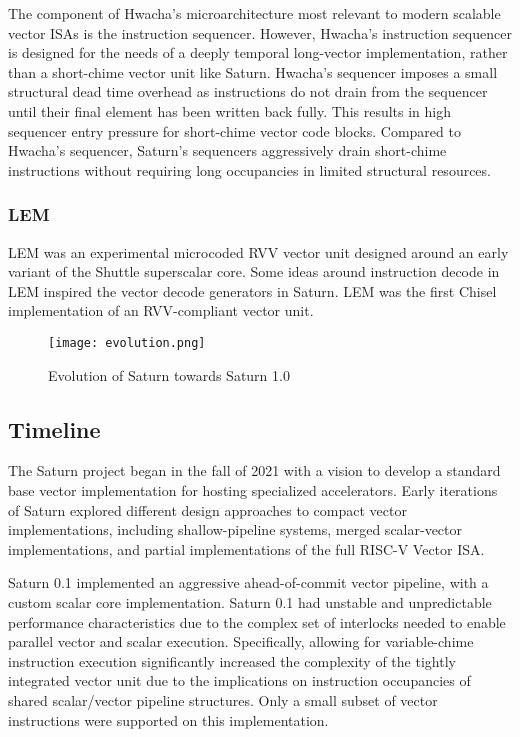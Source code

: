 The component of Hwacha's microarchitecture most relevant to modern scalable vector ISAs is the instruction sequencer.
However, Hwacha's instruction sequencer is designed for the needs of a deeply temporal long-vector implementation, rather than a short-chime vector unit like Saturn.
Hwacha's sequencer imposes a small structural dead time overhead as instructions do not drain from the sequencer until their final element has been written back fully.
This results in high sequencer entry pressure for short-chime vector code blocks.
Compared to Hwacha's sequencer, Saturn's sequencers aggressively drain short-chime instructions without requiring long occupancies in limited structural resources.


\subsubsection{LEM}

LEM \cite{fang2022lem} was an experimental microcoded RVV vector unit designed around an early variant of the Shuttle superscalar core.
Some ideas around instruction decode in LEM inspired the vector decode generators in Saturn.
LEM was the first Chisel implementation of an RVV-compliant vector unit.

\begin{figure}[h]
  \centering
  \texttt{[image: evolution.png]}
  \caption{Evolution of Saturn towards Saturn 1.0}
  \label{fig:evolution}
\end{figure}

\subsection{Timeline}

The Saturn project began in the fall of 2021 with a vision to develop a standard base vector implementation for hosting specialized accelerators.
Early iterations of Saturn explored different design approaches to compact vector implementations, including shallow-pipeline systems, merged scalar-vector implementations, and partial implementations of the full RISC-V Vector ISA.


Saturn 0.1 implemented an aggressive ahead-of-commit vector pipeline, with a custom scalar core implementation.
Saturn 0.1 had unstable and unpredictable performance characteristics due to the complex set of interlocks needed to enable parallel vector and scalar execution.
Specifically, allowing for variable-chime instruction execution significantly increased the complexity of the tightly integrated vector unit due to the implications on instruction occupancies of shared scalar/vector pipeline structures.
Only a small subset of vector instructions were supported on this implementation.

